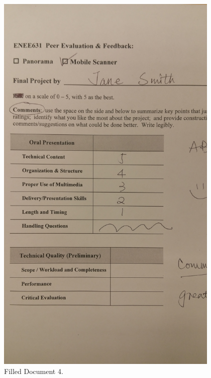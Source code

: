 \begin{figure}[th]
	\centering
	\includegraphics[height=19cm ]{Figures/test_scanned_image_2}
	\caption[Filled Document 4]{Filled Document 4.}
	\label{fig:FilledDocument4}
\end{figure}
\pagebreak
